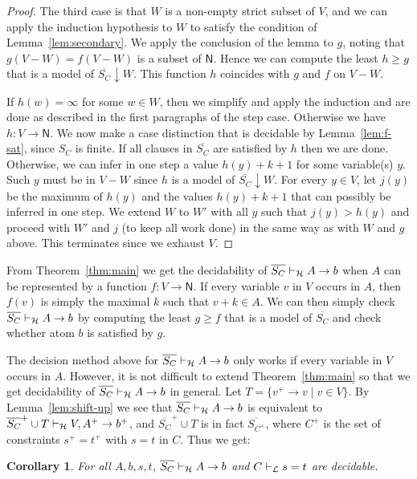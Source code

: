 \documentclass[11pt,a4paper]{article}
\newtheorem{corollary}[theorem]{Corollary}
\newcommand{\N}{\mathsf{N}}
\newcommand\set[1]{\{#1\}}
\newcommand\lathy{{\cal L}}
\newcommand\prvL{\vdash_{\lathy}}
\newcommand\prvH{\vdash_{\cal H}}
\newcommand\upS[1]{\overline{S_{#1}}}
\begin{document}
\begin{proof}
The third case is that $W$ is a non-empty strict 
subset of $V$, and we can apply the induction
hypothesis to $W$ to satisfy the condition of 
Lemma~\ref{lem:secondary}. We apply the conclusion of 
the lemma to $g$, noting that $g(V-W)=f(V-W)$ is
a subset of $\N$. Hence we can compute the least 
$h\geqslant g$ that is a model of $\upS{C}{\downarrow}W$.
This function $h$ coincides with $g$ and $f$ on $V-W$. 

If $h(w) = \infty$ for some $w\in W$, 
then we simplify and apply the induction and are done 
as described in the first paragraphs of the step case.
Otherwise we have $h: V\to\N$.
We now make a case distinction that is decidable by 
Lemma~\ref{lem:f-sat}, since $S_C$ is finite.
If all clauses in $\upS{C}$ are satisfied by $h$ then we are done.
Otherwise, we can infer in one step a value $h(y)+k+1$ 
for some variable(s) $y$. Such $y$ must be in $V-W$ 
since $h$ is a model of $\upS{C}{\downarrow}W$.
For every $y\in V$, let $j(y)$ be the maximum of $h(y)$
and the values $h(y)+k+1$ that can possibly
be inferred in one step.
We extend $W$ to $W'$ with all $y$ such that $j(y)>h(y)$ 
and proceed with $W'$ and $j$ (to keep all work done)
in the same way as with $W$ and $g$ above.
This terminates since we exhaust $V$.
\end{proof}


From Theorem~\ref{thm:main} we get the decidability of $\upS{C}\prvH A\to b$
when $A$ can be represented by a function $f: V\to\N$. If every
variable $v$ in $V$ occurs in $A$, then $f(v)$ is simply
the maximal $k$ such that $v+k \in A$. We can then simply check
$\upS{C}\prvH A\to b$ by computing the least $g\geqslant f$ that is
a model of $\upS{C}$ and check whether atom $b$ is satisfied by $g$.

The decision method above for $\upS{C}\prvH A\to b$ only works
if every variable in $V$ occurs in $A$.
However, it is not difficult to extend Theorem~\ref{thm:main}
so that we get decidability of $\upS{C}\prvH A\to b$ in general. 
Let $T=\set{v^+\to v \mid v\in V}$. By Lemma~\ref{lem:shift-up}
we see that $\upS{C}\prvH A\to b$ is equivalent to
$\upS{C}^+ \cup T \prvH V,A^+ \to b^+$, and
$\upS{C}^+ \cup T$ is in fact $\upS{C^+}$, where
$C^+$ is the set of constraints $s^+ = t^+$ with $s=t$ in $C$.
 Thus we get:

\begin{corollary}\label{cor:decidability}
For all $A,b,s,t$, $\upS{C}\prvH A\to b$ and $C\prvL s=t$ are decidable.
\end{corollary}
\end{document}
